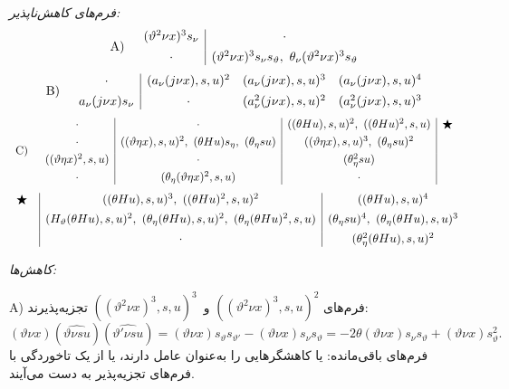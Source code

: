 \documentclass[11pt]{article}
\begin{document}
\noindent\emph{فرم‌های کاهش‌ناپذیر:}
\[
\begin{array}{r@{\quad}c}
\text{A)}&
\begin{array}{c|c}
(\vartheta^2\nu x)^3s_\nu&\cdot\\[0.45em]
\cdot&(\vartheta^2\nu x)^3s_\nu s_\vartheta,\ \theta_\nu(\vartheta^2\nu x)^3s_\vartheta
\end{array}
\end{array}
\]
\[
\begin{array}{r@{\quad}c}
\text{B)}&
\begin{array}{c|ccc}
\cdot&(a_\nu(j\nu x),s,u)^2&(a_\nu(j\nu x),s,u)^3&(a_\nu(j\nu x),s,u)^4\\[0.45em]
a_\nu(j\nu x)s_\nu&\cdot&(a_\nu^2(j\nu x),s,u)^2&(a_\nu^2(j\nu x),s,u)^3
\end{array}
\end{array}
\]
\[
\begin{array}{r@{\quad}c}
\text{C)}&
\begin{array}{c|c|c|c}
\cdot&\cdot&((\theta Hu),s,u)^2,\ ((\theta Hu)^2,s,u)&\bigstar\\[0.35em]
\cdot&((\vartheta\eta x),s,u)^2,\ (\theta Hu)s_\eta,\ (\theta_\eta su)&((\vartheta\eta x),s,u)^3,\ (\theta_\eta su)^2&\\[0.35em]
((\vartheta\eta x)^2,s,u)&\cdot&(\theta_\eta^2su)&\\[0.35em]
\cdot&(\theta_\eta(\vartheta\eta x)^2,s,u)&\cdot&
\end{array}
\end{array}
\]
\[
\begin{array}{c@{\quad}|c|c}
\bigstar&((\theta Hu),s,u)^3,\ ((\theta Hu)^2,s,u)^2&((\theta Hu),s,u)^4\\[0.45em]
&(H_\vartheta(\theta Hu),s,u)^2,\ (\theta_\eta(\theta Hu),s,u)^2,\ (\theta_\eta(\theta Hu)^2,s,u)&(\theta_\eta su)^4,\ (\theta_\eta(\theta Hu),s,u)^3\\[0.45em]
&\cdot&(\theta_\eta^2(\theta Hu),s,u)^2
\end{array}
\]

\noindent\emph{کاهش‌ها:}

A) فرم‌های $((\vartheta^2\nu x)^3,s,u)^2$ و~$((\vartheta^2\nu x)^3,s,u)^3$ تجزیه‌پذیرند:
\[
(\vartheta \nu x)(\widehat{\vartheta \nu su})(\widehat{\vartheta'\nu su})
=(\vartheta \nu x)s_\vartheta s_{\vartheta'}-(\vartheta \nu x)s_\nu s_\vartheta
=-2\theta(\vartheta \nu x)s_\nu s_\vartheta+(\vartheta \nu x)s_\vartheta^2.
\]
فرم‌های باقی‌مانده: یا کاهشگرهایی را به‌عنوان عامل دارند، یا از یک تاخوردگی با فرم‌های تجزیه‌پذیر به دست می‌آیند.
\end{document}
